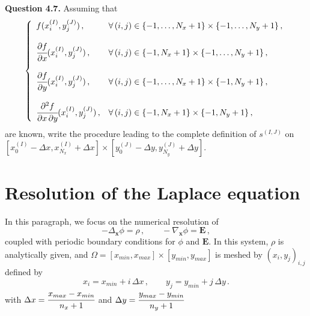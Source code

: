 \documentclass[10pt]{article}
\newcommand{\D}{{\partial}}
\begin{document}
\begin{leftbar}
\textbf{Question 4.7.} Assuming that
\begin{displaymath}
\left\{
\begin{array}{ll}
f(x_{i}^{(I)},y_{j}^{(J)}) \, , & \forall\, (i,j) \in \{-1,\dots,N_{x}+1\} \times \{-1,\dots,N_{y}+1\} \, , \\ \\
\cfrac{\D f}{\D x}(x_{i}^{(I)},y_{j}^{(J)}) \, , & \forall\, (i,j) \in \{ -1,N_{x}+1\} \times \{-1,\dots,N_{y}+1\} \, , \\ \\
\cfrac{\D f}{\D y}(x_{i}^{(I)},y_{j}^{(J)}) \, , & \forall\, (i,j) \in \{ -1,\dots,N_{x}+1\} \times \{-1,N_{y}+1\} \, , \\ \\
\cfrac{\D^{2}f}{\D x\,\D y}(x_{i}^{(I)},y_{j}^{(J)}) \, , & \forall\, (i,j) \in \{ -1,N_{x}+1\} \times \{ -1,N_{y}+1\} \, ,
\end{array}
\right.
\end{displaymath}
are known, write the procedure leading to the complete definition of $s^{(I,J)}$ on $[x_{0}^{(I)}-\Delta x, x_{N_{x}}^{(I)}+\Delta x] \times [y_{0}^{(J)}-\Delta y, y_{N_{y}}^{(J)}+\Delta y]$.
\end{leftbar}





\section{Resolution of the Laplace equation}
\setcounter{equation}{0}

In this paragraph, we focus on the numerical resolution of
\begin{equation} \label{Laplace}
-\Delta_{\mathbf{x}}\phi = \rho \, , \qquad -\nabla_{\mathbf{x}}\phi = \mathbf{E} \, ,
\end{equation}
coupled with periodic boundary conditions for $\phi$ and $\mathbf{E}$. In this system, $\rho$ is analytically given, and $\Omega = [x_{min},x_{max}] \times [y_{min},y_{max}]$ is meshed by $(x_{i},y_{j})_{i,j}$ defined by \\
\begin{equation}
x_{i} = x_{min} + i\, \Delta x \, , \qquad y_{j} = y_{min} + j\, \Delta y \, .
\end{equation}
with $\Delta x = \cfrac{x_{max}-x_{min}}{n_{x}+1}$ and $\Delta y = \cfrac{y_{max}-y_{min}}{n_{y}+1}$
\end{document}
